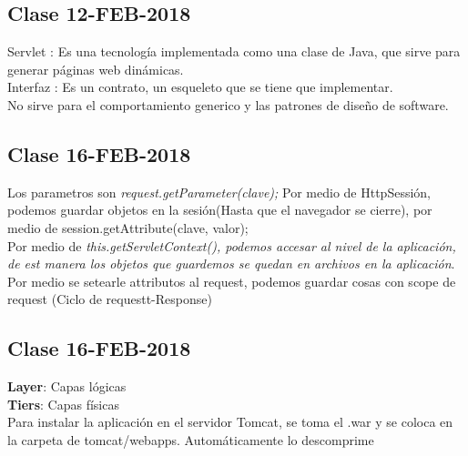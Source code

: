 \documentclass{article}
\begin{document}
\subsection{Clase 12-FEB-2018}
Servlet : Es una tecnología implementada como una clase de Java, que sirve para generar páginas web dinámicas.\\
Interfaz :  Es un contrato, un esqueleto que se tiene que implementar.\\
No sirve para el comportamiento generico y las patrones de diseño de software.\\
\subsection{Clase 16-FEB-2018}
Los parametros son \textit{request.getParameter(clave);}
Por medio de HttpSessión, podemos guardar objetos en la sesión(Hasta que el navegador se cierre), por medio de session.getAttribute(clave, valor);\\
Por medio de \textit{this.getServletContext(), podemos accesar al nivel de la aplicación, de est manera los objetos que guardemos se quedan en archivos en la aplicación}.\\
Por medio se setearle attributos al request, podemos guardar cosas con scope de request (Ciclo de requestt-Response)
\subsection{Clase 16-FEB-2018}
\textbf{Layer}: Capas lógicas\\
\textbf{Tiers}: Capas físicas\\
Para instalar la aplicación en el servidor Tomcat, se toma el .war y se coloca en la carpeta de tomcat/webapps. Automáticamente lo descomprime
\end{document}
